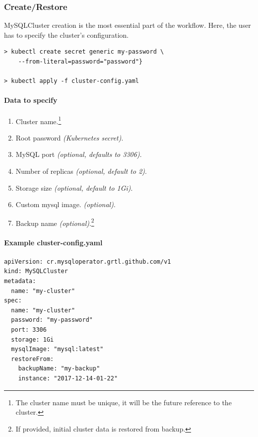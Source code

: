 \subsubsection*{Create/Restore}

MySQLCluster creation is the most essential part of the
workflow. Here, the user has to specify the cluster's configuration.

\begin{lstlisting}
> kubectl create secret generic my-password \
	--from-literal=password="password"}

> kubectl apply -f cluster-config.yaml
\end{lstlisting}

\paragraph{Data to specify}
\begin{enumerate}
	\item Cluster name.\footnote{The cluster name must be unique, it will be the future reference
	to the cluster.}
	\item Root password \textit{(Kubernetes secret)}.
	\item MySQL port \textit{(optional, defaults to 3306)}.
	\item Number of replicas \textit{(optional, default to 2)}.
	\item Storage size \textit{(optional, default to 1Gi)}.
	\item Custom mysql image. \textit{(optional)}.
	\item Backup name \textit{(optional)}.\footnote{If provided, initial cluster data is restored
	from backup.}
\end{enumerate}

\paragraph{Example \textbf{cluster-config.yaml}}
\begin{lstlisting}[caption=cluster-config.yaml,captionpos=b]
apiVersion: cr.mysqloperator.grtl.github.com/v1
kind: MySQLCluster
metadata:
  name: "my-cluster"
spec:
  name: "my-cluster"
  password: "my-password"
  port: 3306
  storage: 1Gi
  mysqlImage: "mysql:latest"
  restoreFrom:
	backupName: "my-backup"
	instance: "2017-12-14-01-22"
\end{lstlisting}

